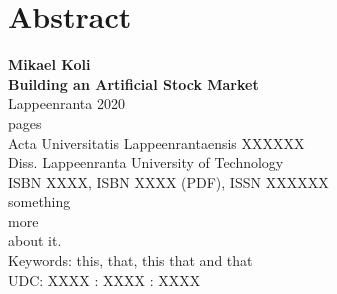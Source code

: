 \section*{Abstract}

\textbf{Mikael Koli}\\
\textbf{Building an Artificial Stock Market}\\
Lappeenranta 2020\\
\pageref{LastPage} pages\\
Acta Universitatis Lappeenrantaensis XXXXXX\\
Diss. Lappeenranta University of Technology\\
ISBN XXXX, ISBN XXXX (PDF), ISSN XXXXXX\\

something\\

more\\

about it.\\

Keywords: this, that, this that and that\\
UDC: XXXX : XXXX : XXXX\\
